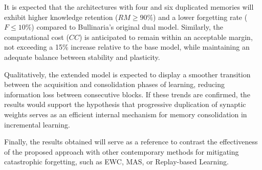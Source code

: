 It is expected that the architectures with four and six duplicated memories will exhibit higher knowledge retention (\(RM \geq 90\%\)) and a lower forgetting rate (\(F \leq 10\%\)) compared to Bullinaria’s original dual model.  
Similarly, the computational cost (\(CC\)) is anticipated to remain within an acceptable margin, not exceeding a 15\% increase relative to the base model, while maintaining an adequate balance between stability and plasticity.

Qualitatively, the extended model is expected to display a smoother transition between the acquisition and consolidation phases of learning, reducing information loss between consecutive blocks.  
If these trends are confirmed, the results would support the hypothesis that progressive duplication of synaptic weights serves as an efficient internal mechanism for memory consolidation in incremental learning.

Finally, the results obtained will serve as a reference to contrast the effectiveness of the proposed approach with other contemporary methods for mitigating catastrophic forgetting, such as EWC, MAS, or Replay-based Learning.
